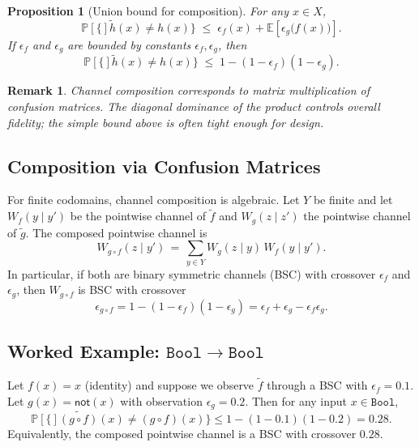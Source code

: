 \documentclass[11pt,final,hidelinks]{article}
\newtheorem{proposition}[theorem]{Proposition}
\newtheorem{remark}[theorem]{Remark}
\newcommand{\obs}[1]{\widetilde{#1}}  %
\newcommand{\Type}[1]{\mathtt{#1}}
\newcommand{\Prob}[1]{\mathbb{P}\left[#1\right]}
\newcommand{\Expect}[1]{\mathbb{E}\left[#1\right]}
\newcommand{\error}{\epsilon}
\newcommand{\Bool}{\Type{Bool}}
\begin{document}
\begin{proposition}[Union bound for composition]
For any $x\in X$,
\begin{equation}
\Prob\{\obs{h}(x)\neq h(x)\} \;\le\; \error_f(x) + \Expect{\error_g\bigl(f(x)\bigr)}.
\end{equation}
If $\error_f$ and $\error_g$ are bounded by constants $\epsilon_f,\epsilon_g$, then
\begin{equation}
\Prob\{\obs{h}(x)\neq h(x)\} \;\le\; 1-(1-\epsilon_f)(1-\epsilon_g).
\end{equation}
\end{proposition}

\begin{remark}
Channel composition corresponds to matrix multiplication of confusion matrices. The diagonal dominance of the product controls overall fidelity; the simple bound above is often tight enough for design.
\end{remark}

\subsection{Composition via Confusion Matrices}

For finite codomains, channel composition is algebraic. Let $Y$ be finite and let $W_f(y\mid y')$ be the pointwise channel of $\obs{f}$ and $W_g(z\mid z')$ the pointwise channel of $\obs{g}$. The composed pointwise channel is
\begin{equation}
    W_{g\circ f}(z\mid y') \,=\, \sum_{y\in Y} W_g(z\mid y)\,W_f(y\mid y').
\end{equation}
In particular, if both are binary symmetric channels (BSC) with crossover $\epsilon_f$ and $\epsilon_g$, then $W_{g\circ f}$ is BSC with crossover
\begin{equation}
    \epsilon_{g\circ f} = 1-(1-\epsilon_f)(1-\epsilon_g) = \epsilon_f+\epsilon_g-\epsilon_f\epsilon_g.
\end{equation}

\subsection{Worked Example: $\Bool\to\Bool$}

Let $f(x)=x$ (identity) and suppose we observe $\obs{f}$ through a BSC with $\epsilon_f=0.1$. Let $g(x)=\mathsf{not}(x)$ with observation $\epsilon_g=0.2$. Then for any input $x\in\Bool$,
\begin{equation}
    \Prob\{\obs{(g\circ f)}(x)\neq (g\circ f)(x)\} \le 1-(1-0.1)(1-0.2)=0.28.
\end{equation}
Equivalently, the composed pointwise channel is a BSC with crossover $0.28$.
\end{document}
